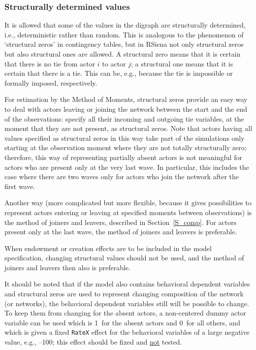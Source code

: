 \documentclass[a4paper,fleqn,11pt]{article}
\newcommand{\+}{\, + \,}
\newcommand{\RS}{{\sf \textsf{RSiena} }}
\begin{document}
\subsubsection{Structurally determined values}
\label{S_struct}

It is allowed that some of the values in the digraph are
structurally determined, i.e., deterministic rather than random.
This is analogous to the phenomenon of `structural zeros' in
contingency tables, but in \RS not only structural zeros but also
structural ones are allowed. A structural zero means that it is
certain that there is no tie from actor $i$ to actor $j$; a
structural one means that it is certain that there is a tie. This
can be, e.g., because the tie is impossible or formally imposed,
respectively.

For estimation by the Method of Moments,
structural zeros provide an easy way to deal with actors leaving
or joining the network between the start and the end
of the observations: specify all their incoming and outgoing tie
variables, at the moment that they are not present, as structural zeros.
Note that actors having all values specified as structural zeros in this way
take part of the simulations only starting at the observation moment
where they are not totally structurally zero;
therefore, this way of representing partially absent actors
is not meaningful for actors who are present only at the very last wave.
In particular, this includes the case where there are two waves only
for actors who join the network after the first wave.

Another way (more complicated but more flexible,
because it gives possibilities to represent actors
entering or leaving at specified moments between observations)
is the method of joiners and leavers, described in Section~\ref{S_comp}.
For actors present only at the last wave, the method of
joiners and leavers is preferable.

When endowment or creation effects are to be included in the
model specification, changing structural values should not be used,
and the method of joiners and leavers then also is preferable.

It should be noted that if the model also contains behavioral dependent
variables and structural zeros are used to represent changing
composition of the network (or networks), the behavioral dependent variables
still will be possible to change. To keep them from changing for the absent
actors, a non-centered dummy actor variable can be used which is 1~for the absent
actors and 0~for all others, and which is given a fixed \texttt{RateX} effect
for the behavioral variables of a large negative value, e.g., --100;
this effect should be fixed and \underline{not} tested.
\bigskip
\end{document}
